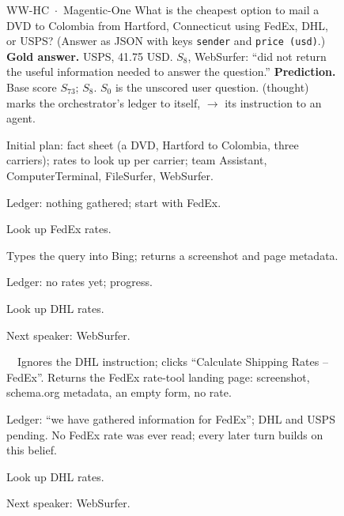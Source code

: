 \begin{figure}[p]
\centering
\begin{minipage}{\textwidth}
\begin{qbox}{\textsc{WW-HC} \,$\cdot$\, Magentic-One}
\fontsize{6.4}{7.2}\selectfont
{} What is the cheapest option to mail a DVD to Colombia from Hartford,
Connecticut using FedEx, DHL, or USPS? (Answer as JSON with keys \texttt{sender} and
\texttt{price (usd)}.) \textbf{Gold answer.} USPS, 41.75 USD.
 $S_8$, WebSurfer: ``did not return the useful information needed to
answer the question.'' \textbf{Prediction.} Base score $S_{73}$; \soap{} $S_8$.
 $S_0$ is the unscored user question. \textsf{(thought)} marks the
orchestrator's ledger to itself, \textsf{$\rightarrow$} its instruction to an agent.
\smallskip

Initial plan: fact sheet (a DVD, Hartford to Colombia, three carriers); rates to look
up per carrier; team Assistant, ComputerTerminal, FileSurfer, WebSurfer.

Ledger: nothing gathered; start with FedEx.

Look up FedEx rates.

Types the query into Bing; returns a screenshot and page metadata.

Ledger: no rates yet; progress.

Look up DHL rates.

Next speaker: WebSurfer.

\qgold\ \qsoap\
Ignores the DHL instruction; clicks ``Calculate Shipping Rates -- FedEx''. Returns the
FedEx rate-tool landing page: screenshot, schema.org metadata, an empty form, no rate.

Ledger: ``we have gathered information for FedEx''; DHL and USPS pending. No FedEx rate
was ever read; every later turn builds on this belief.

Look up DHL rates.

Next speaker: WebSurfer.


\end{qbox}
\end{minipage}
\end{figure}
